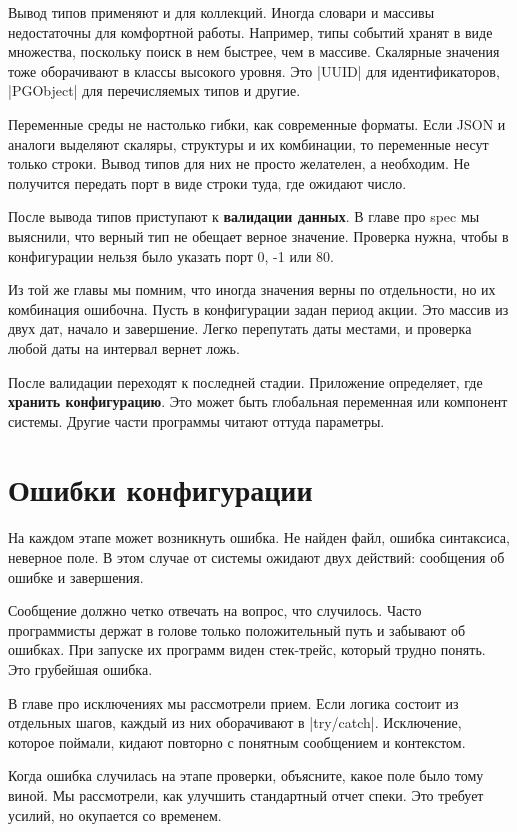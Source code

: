 Вывод типов применяют и для коллекций. Иногда словари и массивы недостаточны для
комфортной работы. Например, типы событий хранят в виде множества, поскольку
поиск в нем быстрее, чем в массиве. Скалярные значения тоже оборачивают в классы
высокого уровня. Это \spverb|UUID| для идентификаторов, \spverb|PGObject| для
перечисляемых типов и другие.

Переменные среды не настолько гибки, как современные форматы. Если JSON и
аналоги выделяют скаляры, структуры и их комбинации, то переменные несут только
строки. Вывод типов для них не просто желателен, а необходим. Не получится
передать порт в виде строки туда, где ожидают число.

После вывода типов приступают к \textbf{валидации данных}. В главе про spec мы
выяснили, что верный тип не обещает верное значение. Проверка нужна, чтобы в
конфигурации нельзя было указать порт 0, -1 или 80.

Из той же главы мы помним, что иногда значения верны по отдельности, но их
комбинация ошибочна. Пусть в конфигурации задан период акции. Это массив из двух
дат, начало и завершение. Легко перепутать даты местами, и проверка любой даты
на интервал вернет ложь.

После валидации переходят к последней стадии. Приложение определяет, где
\textbf{хранить конфигурацию}. Это может быть глобальная переменная или
компонент системы. Другие части программы читают оттуда параметры.

\section{Ошибки конфигурации}

На каждом этапе может возникнуть ошибка. Не найден файл, ошибка синтаксиса,
неверное поле. В этом случае от системы ожидают двух действий: сообщения об
ошибке и завершения.

Сообщение должно четко отвечать на вопрос, что случилось. Часто программисты
держат в голове только положительный путь и забывают об ошибках. При запуске их
программ виден стек-трейс, который трудно понять. Это грубейшая ошибка.


В главе про исключениях мы рассмотрели прием. Если логика состоит из отдельных
шагов, каждый из них оборачивают в \spverb|try/catch|. Исключение, которое
поймали, кидают повторно с понятным сообщением и контекстом.

Когда ошибка случилась на этапе проверки, объясните, какое поле было тому
виной. Мы рассмотрели, как улучшить стандартный отчет спеки. Это требует усилий,
но окупается со временем.


